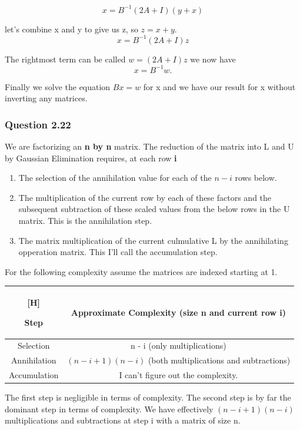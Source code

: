 \documentclass{article}
\begin{document}
$$x = B^{-1} (2A + I)(y + x)$$

let's combine x and y to give us z, so $z = x + y$.
$$x = B^{-1} (2A + I)z$$

The rightmost term can be called $w  = (2A + I) z$ we now have
$$x = B^{-1} w.$$

Finally we solve the equation $Bx = w$ for x and we have our result for x without
inverting any matrices.

\subsubsection{Question 2.22}

We are factorizing an \textbf{n by n} matrix. The reduction of the matrix into L and U
by Gaussian Elimination requires, at each row \textbf{i}

\begin{enumerate}
\item The selection of the annihilation value for each of the $n-i$ rows below.
\item The multiplication of the current row by each of these factors and the subsequent subtraction 
of these scaled values from the below rows in the U matrix. This is the annihilation step.
\item The matrix multiplication of the current culmulative L by the annihilating opperation matrix. This I'll call the accumulation step.
\end{enumerate}

For the following complexity assume the matrices are indexed starting at 1.

\begin{flushleft}
\begin{tabular}{c | c}[H]

Step & Approximate Complexity (size n and current row i)\\
\hline
Selection & n - i (only multiplications)\\
Annihilation & $(n-i + 1)(n-i)$ (both multiplications and subtractions)\\
Accumulation & {\color{red}I can't figure out the complexity.}\\
\end{tabular}
\end{flushleft}

The first step is negligible in terms of complexity. The second step is by far the dominant
step in terms of complexity. We have effectively $(n-i+1)(n-i)$ multiplications and
subtractions at step i with a matrix of size n.
\end{document}
